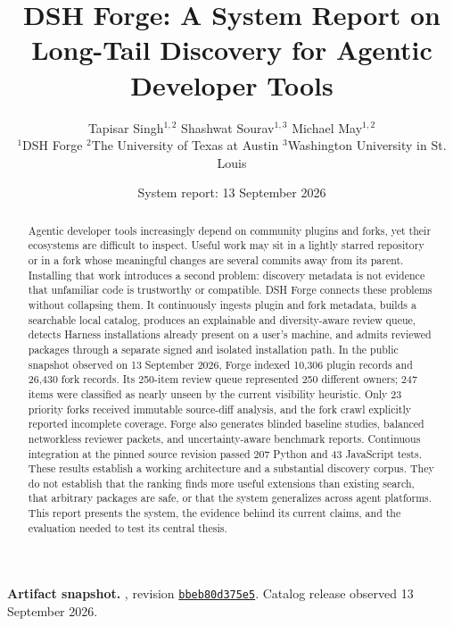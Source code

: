 \documentclass[10pt,twocolumn]{article}
\begin{document}
\title{\sffamily\bfseries DSH Forge: A System Report on Long-Tail Discovery for Agentic Developer Tools}
\author{Tapisar Singh$^{1,2}$ \qquad Shashwat Sourav$^{1,3}$ \qquad Michael May$^{1,2}$\\[4pt]
\small $^{1}$DSH Forge \quad $^{2}$The University of Texas at Austin \quad $^{3}$Washington University in St. Louis}
\date{\small System report: 13 September 2026}
\maketitle

\begin{abstract}
Agentic developer tools increasingly depend on community plugins and forks, yet their ecosystems are difficult to inspect. Useful work may sit in a lightly starred repository or in a fork whose meaningful changes are several commits away from its parent. Installing that work introduces a second problem: discovery metadata is not evidence that unfamiliar code is trustworthy or compatible. DSH Forge connects these problems without collapsing them. It continuously ingests plugin and fork metadata, builds a searchable local catalog, produces an explainable and diversity-aware review queue, detects Harness installations already present on a user's machine, and admits reviewed packages through a separate signed and isolated installation path. In the public snapshot observed on 13 September 2026, Forge indexed 10,306 plugin records and 26,430 fork records. Its 250-item review queue represented 250 different owners; 247 items were classified as nearly unseen by the current visibility heuristic. Only 23 priority forks received immutable source-diff analysis, and the fork crawl explicitly reported incomplete coverage. Forge also generates blinded baseline studies, balanced networkless reviewer packets, and uncertainty-aware benchmark reports. Continuous integration at the pinned source revision passed 207 Python and 43 JavaScript tests. These results establish a working architecture and a substantial discovery corpus. They do not establish that the ranking finds more useful extensions than existing search, that arbitrary packages are safe, or that the system generalizes across agent platforms. This report presents the system, the evidence behind its current claims, and the evaluation needed to test its central thesis.
\end{abstract}

\noindent\textbf{Artifact snapshot.} \repo, revision \href{https://github.com/MichaelTheMay/dsh-forge/commit/bbeb80d375e528181b14f5a9df5a73c8f6b90cbd}{\texttt{bbeb80d375e5}}. Catalog release observed 13 September 2026.
\end{document}
